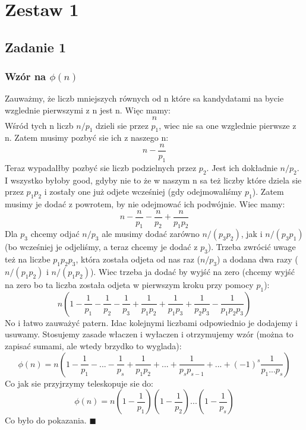 \section{Zestaw 1}
\subsection{Zadanie 1}
\subsubsection{Wzór na $\phi(n)$}
Zauważmy, że liczb mniejszych równych od n które sa kandydatami na bycie wzglednie pierwszymi z n jest n. Więc mamy:
$$n$$
Wśród tych n liczb $n/p_1$ dzieli sie przez $p_1$, wiec nie sa one wzglednie pierwsze z n. Zatem musimy pozbyć sie ich z naszego n:
$$n - \frac{n}{p_1}$$
Teraz wypadalłby pozbyć sie liczb podzielnych przez $p_2$. Jest ich dokładnie $n/p_2$. I wszystko byłoby good, gdyby nie to że w naszym n sa też liczby które dziela sie przez $p_1 p_2$ i zostały one już odjete wcześniej (gdy odejmowaliśmy $p_1$). Zatem musimy je dodać z powrotem, by nie odejmować ich podwójnie. Wiec mamy:
$$n - \frac{n}{p_1} - \frac{n}{p_2} + \frac{n}{p_1 p_2}$$
Dla $p_3$ chcemy odjać $n/p_3$ ale musimy dodać zarówno $n/(p_3 p_2)$, jak i $n/(p_3 p_1)$ (bo wcześniej je odjeliśmy, a teraz chcemy je dodać z $p_3$). Trzeba zwrócić uwage też na liczbe $p_1 p_2 p_3$, która została odjeta od nas raz ($n/p_3$) a dodana dwa razy ($n/(p_1 p_2)$ i $n/(p_1 p_2)$). Wiec trzeba ja dodać by wyjść na zero (chcemy wyjść na zero bo ta liczba została odjeta w pierwszym kroku przy pomocy $p_1$):
$$n (1- \frac{1}{p_1} - \frac{1}{p_2} - \frac{1}{p_3} + \frac{1}{p_1 p_2} + \frac{1}{p_1 p_3} + \frac{1}{p_2 p_3} - \frac{1}{p_1 p_2 p_3})$$
No i łatwo zauważyć patern. Idac kolejnymi liczbami odpowiednio je dodajemy i usuwamy. Stosujemy zasade właczen i wyłaczen i otrzymujemy wzór (można to zapisać sumami, ale wtedy brzydko to wyglada):
$$\phi(n) = n (1- \frac{1}{p_1} - ... - \frac{1}{p_s} + \frac{1}{p_1 p_2} + ... + \frac{1}{p_s p_{s-1}} + ... + (-1)^s \frac{1}{p_1 ... p_s})$$
Co jak sie przyjrzymy teleskopuje sie do:
$$\phi(n) = n (1- \frac{1}{p_1})(1 - \frac{1}{p_2})...(1 - \frac{1}{p_s})$$
Co było do pokazania. $\blacksquare$

